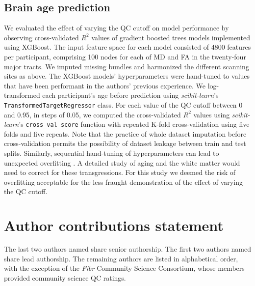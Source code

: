\documentclass[9pt,lineno]{elife}
\begin{document}
\subsection{Brain age prediction}

We evaluated the effect of varying the QC cutoff on model performance by
observing cross-validated $R^2$ values of gradient boosted trees models
implemented using XGBoost. The input feature space for each model consisted of
\num{4800} features per participant, comprising 100 nodes for each of MD and FA in
the twenty-four major tracts. We imputed missing bundles and harmonized the
different scanning sites as above. The XGBoost models' hyperparameters were
hand-tuned to values that have been performant in the authors' previous
experience. We log-transformed each participant's age before prediction using
\emph{scikit-learn}'s \texttt{TransformedTargetRegressor} class. For each value
of the QC cutoff between 0 and 0.95, in steps of 0.05, we computed the
cross-validated $R^2$ values using \emph{scikit-learn}'s
\texttt{cross\_val\_score} function with repeated K-fold cross-validation using
five folds and five repeats. Note that the practice of whole dataset imputation
before cross-validation permits the possibility of dataset leakage between train
and test splits. Similarly, sequential hand-tuning of hyperparameters can lead
to unexpected overfitting \citep{hosseini2020itried}. A detailed study of aging
and the white matter would need to correct for these transgressions. For this
study we deemed the risk of overfitting acceptable for the less fraught
demonstration of the effect of varying the QC cutoff.

\section{Author contributions statement}

The last two authors named share senior authorship. The first two authors named
share lead authorship. The remaining authors are listed in alphabetical order,
with the exception of the \emph{Fibr} Community Science Consortium, whose members
provided community science QC ratings.

\end{document}
